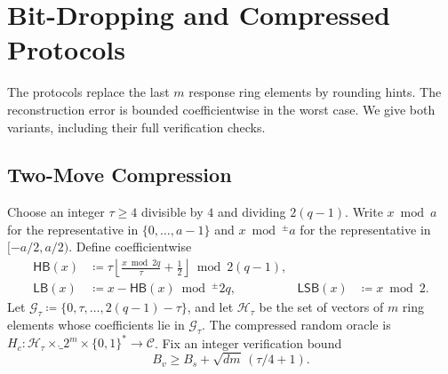 \section{Bit-Dropping and Compressed Protocols}
\label{app:compression}

The protocols replace the last $m$ response ring elements by rounding hints. The reconstruction error is bounded coefficientwise in the worst case. We give both variants, including their full verification checks.

\subsection{Two-Move Compression}
\label{app:two-compression}

\begin{definition}
\label{def:rounding}
Choose an integer $\tau\ge4$ divisible by $4$ and dividing $2(q-1)$. Write $x\bmod a$ for the representative in $\{0,\ldots,a-1\}$ and $x\bmod^{\pm}a$ for the representative in $[-a/2,a/2)$. Define coefficientwise
\begin{align*}
 \mathsf{HB}(x)&\coloneqq\tau\left\lfloor\frac{x\bmod2q}{\tau}+\frac12\right\rfloor\bmod2(q-1),\\
 \mathsf{LB}(x)&\coloneqq x-\mathsf{HB}(x)\bmod^{\pm}2q,
 &\mathsf{LSB}(x)&\coloneqq x\bmod2.
\end{align*}
Let $\mathcal G_\tau\coloneqq\{0,\tau,\ldots,2(q-1)-\tau\}$, and let $\mathcal H_\tau$ be the set of vectors of $m$ ring elements whose coefficients lie in $\mathcal G_\tau$. The compressed random oracle is $H_c\colon\mathcal H_\tau\times\ring_2^m\times\{0,1\}^*\to\mathcal C$. Fix an integer verification bound
\begin{equation}
\label{eq:verification-bound}
 B_v\ge B_s+\sqrt{dm}\,(\tau/4+1).
\end{equation}
\end{definition}

